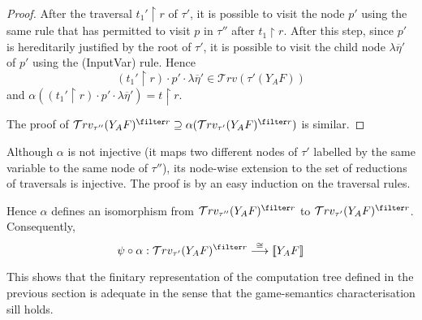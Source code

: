 \documentclass{article}
\newcommand{\sem}[1]{{[\![ #1 ]\!]}}
\newcommand{\travset}{\mathcal{T}rv}
\begin{document}
\begin{proof}
After the traversal $t_1'\upharpoonright r$ of $\tau'$, it is possible to  visit the node $p'$ using the same rule that has permitted to visit $p$ in $\tau''$ after $t_1\upharpoonright r$. After this step, since $p'$ is hereditarily justified by the root of $\tau'$, it is possible to visit the child node $\lambda \overline{\eta}'$ of $p'$ using the (InputVar) rule. Hence
$$(t_1'\upharpoonright r) \cdot p' \cdot \lambda \overline{\eta}' \in \travset(\tau'(Y_A F)) $$
and $\alpha((t_1'\upharpoonright r) \cdot p' \cdot \lambda \overline{\eta}') = t\upharpoonright r$.

The proof of $\travset_{\tau''}(Y_A F)^{\filter r} \supseteq \alpha(\travset_{\tau'}(Y_A F)^{\filter r})$ is similar.
 \end{proof}

Although $\alpha$ is not injective (it maps two different nodes of $\tau'$ labelled by the same variable to the same node of $\tau''$), its node-wise extension to the set of reductions of traversals is injective.
The proof is by an easy induction on the traversal rules.



Hence $\alpha$ defines an isomorphism from $\travset_{\tau''}(Y_A F)^{\filter r}$
to $\travset_{\tau'}(Y_A F)^{\filter r}$.
Consequently,
$$ \psi  \circ \alpha : \travset_{\tau'}( Y_A F)^{\filter r} \stackrel{\cong}{\longrightarrow} \sem{Y_A F}$$

This shows that the finitary representation of the computation tree defined in the previous section is adequate in the sense that the game-semantics characterisation sill holds.
\end{document}
